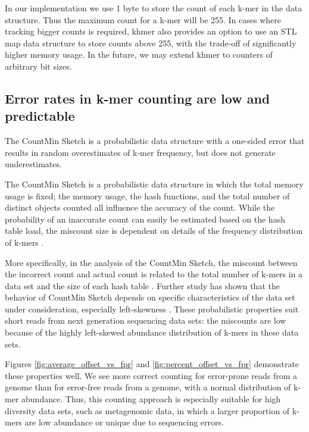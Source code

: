 \documentclass[10pt]{article}
\begin{document}
In our implementation we use 1 byte to store the count of each k-mer
in the data structure. Thus the maximum count for a k-mer will be 255.
In cases where tracking bigger counts is required, khmer also provides
an option to use an STL map data structure to store counts above 255,
with the trade-off of significantly higher memory usage.  In the
future, we may extend khmer to counters of arbitrary bit sizes.


\subsection*{Error rates in k-mer counting are low and predictable}

The CountMin Sketch is a probabilistic data structure with a
one-sided error that results in random overestimates of k-mer
frequency, but does not generate underestimates.

The CountMin Sketch is a probabilistic data structure in which the
total memory usage is fixed; the memory usage, the hash functions, and
the total number of distinct objects counted all influence the
accuracy of the count.  While the probability of an inaccurate count
can easily be estimated based on the hash table load, the miscount
size is dependent on details of the frequency distribution of k-mers
\cite{Cormode2005}.

More specifically, in the analysis of the CountMin
Sketch, the miscount between the incorrect count and
actual count is related to the total number of k-mers in a data set and
the size of each hash table \cite{Cormode2005}. Further study has shown that the behavior
of CountMin Sketch depends on specific characteristics of the data
set under consideration, especially left-skewness \cite{Rusu2008,
  CormodeM05}.  These probabilistic properties suit short reads
from next generation sequencing data sets: the miscounts are
low because of the
highly left-skewed abundance distribution of k-mers in these data sets.

Figures \ref{fig:average_offset_vs_fpr} and \ref{fig:percent_offset_vs_fpr}
demonstrate these properties well.  We see more correct
counting for error-prone reads from a genome than for error-free
reads from a genome, with a normal
distribution of k-mer abundance.  Thus, this counting approach is
especially suitable for high diversity data sets, such as metagenomic
data, in which a larger proportion of k-mers are low abundance or
unique due to sequencing errors.
\end{document}
